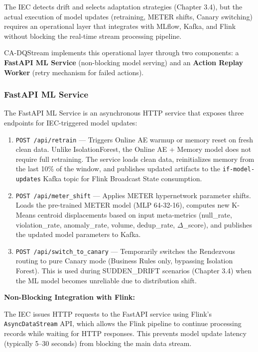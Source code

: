The IEC detects drift and selects adaptation strategies (Chapter 3.4), but the actual execution of model updates (retraining, METER shifts, Canary switching) requires an operational layer that integrates with MLflow, Kafka, and Flink without blocking the real-time stream processing pipeline.

CA-DQStream implements this operational layer through two components: a \textbf{FastAPI ML Service} (non-blocking model serving) and an \textbf{Action Replay Worker} (retry mechanism for failed actions).

\subsubsection{FastAPI ML Service}

The FastAPI ML Service is an asynchronous HTTP service that exposes three endpoints for IEC-triggered model updates:

\begin{enumerate}
    \item \texttt{POST /api/retrain} --- Triggers Online AE warmup or memory reset on fresh clean data. Unlike IsolationForest, the Online AE + Memory model does not require full retraining. The service loads clean data, reinitializes memory from the last 10\% of the window, and publishes updated artifacts to the \texttt{if-model-updates} Kafka topic for Flink Broadcast State consumption.

    \item \texttt{POST /api/meter\_shift} --- Applies METER hypernetwork parameter shifts. Loads the pre-trained METER model (MLP 64-32-16), computes new K-Means centroid displacements based on input meta-metrics (null\_rate, violation\_rate, anomaly\_rate, volume, dedup\_rate, $\Delta$\_score), and publishes the updated model parameters to Kafka.

    \item \texttt{POST /api/switch\_to\_canary} --- Temporarily switches the Rendezvous routing to pure Canary mode (Business Rules only, bypassing Isolation Forest). This is used during SUDDEN\_DRIFT scenarios (Chapter 3.4) when the ML model becomes unreliable due to distribution shift.
\end{enumerate}

\textbf{Non-Blocking Integration with Flink:}

The IEC issues HTTP requests to the FastAPI service using Flink's \texttt{AsyncDataStream} API, which allows the Flink pipeline to continue processing records while waiting for HTTP responses. This prevents model update latency (typically 5--30 seconds) from blocking the main data stream.

